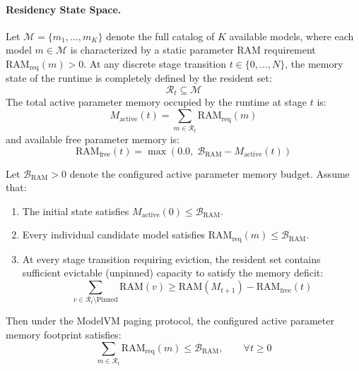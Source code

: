 \paragraph{Residency State Space.}
Let $\mathcal{M} = \{m_1, \dots, m_K\}$ denote the full catalog of $K$ available models, where each model $m \in \mathcal{M}$ is characterized by a static parameter RAM requirement $\text{RAM}_{\text{req}}(m) > 0$. At any discrete stage transition $t \in \{0, \dots, N\}$, the memory state of the runtime is completely defined by the resident set:
\begin{equation}
\mathcal{R}_t \subseteq \mathcal{M}
\end{equation}
The total active parameter memory occupied by the runtime at stage $t$ is:
\begin{equation}
M_{\text{active}}(t) = \sum_{m \in \mathcal{R}_t} \text{RAM}_{\text{req}}(m)
\end{equation}
and available free parameter memory is:
\begin{equation}
\text{RAM}_{\text{free}}(t) = \max\left(0.0, \;\mathcal{B}_{\text{RAM}} - M_{\text{active}}(t)\right)
\end{equation}

\begin{theorem}
\label{thm:memory_invariant}
Let $\mathcal{B}_{\text{RAM}} > 0$ denote the configured active parameter memory budget. Assume that:
\begin{enumerate}
    \item The initial state satisfies $M_{\text{active}}(0) \le \mathcal{B}_{\text{RAM}}$.
    \item Every individual candidate model satisfies $\text{RAM}_{\text{req}}(m) \le \mathcal{B}_{\text{RAM}}$.
    \item At every stage transition requiring eviction, the resident set contains sufficient evictable (unpinned) capacity to satisfy the memory deficit:
    \begin{equation}
    \sum_{v \in \mathcal{R}_t \setminus \text{Pinned}} \text{RAM}(v) \ge \text{RAM}(M_{t+1}) - \text{RAM}_{\text{free}}(t)
    \end{equation}
\end{enumerate}
Then under the ModelVM paging protocol, the configured active parameter memory footprint satisfies:
\begin{equation}
\sum_{m \in \mathcal{R}_t} \text{RAM}_{\text{req}}(m) \le \mathcal{B}_{\text{RAM}}, \qquad \forall t \ge 0
\label{eq:memory_invariant}
\end{equation}
\end{theorem}

